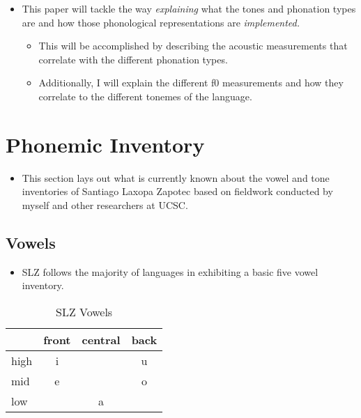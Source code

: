 \documentclass[12pt, letterpaper]{article}
\providecommand{\lsptoprule}{\midrule\toprule}
\providecommand{\lspbottomrule}{\bottomrule\midrule}
\begin{document}
\begin{itemize}
	\item This paper will tackle the way \textit{explaining} what the tones and phonation types are and how those phonological representations are \textit{implemented.}
	\begin{itemize}
		\item This will be accomplished by describing the acoustic measurements that correlate with the different phonation types. 
		\item Additionally, I will explain the different f0 measurements and how they correlate to the different tonemes of the language. 
	\end{itemize}
\end{itemize}


\section{Phonemic Inventory} \label{sec:Inventory}
\begin{itemize}
	\item This section lays out what is currently known about the vowel and tone inventories of Santiago Laxopa Zapotec based on fieldwork conducted by myself and other researchers at UCSC. 
\end{itemize}

\subsection{Vowels}\label{sec:Vowel}
\begin{itemize}
	\item SLZ follows the majority of languages in exhibiting a basic five vowel inventory.
\end{itemize}

\begin{table}[!h]
\centering
\caption{SLZ Vowels}
\label{tab:vow}
 \begin{tabular}{lccc}
  \lsptoprule
            &  front& central  & back \\
  \midrule
	high   	&  i  &     &   u \\
	mid    	&  e  &   	& 	o \\
	low   	&     &  a 	&	  \\
  \lspbottomrule
 \end{tabular}
\end{table}
\end{document}

